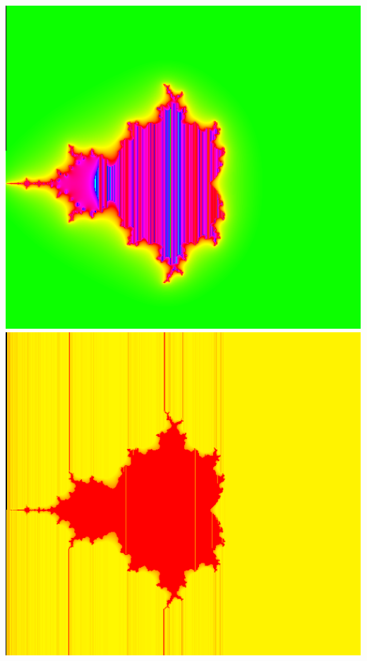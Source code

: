 \documentclass[../r.tex]{subfiles}
\begin{document}
\includegraphics[scale=0.15]{../TAing/mandel/3.png}
\includegraphics[scale=0.15]{../TAing/mandel/4.png}
\end{document}
